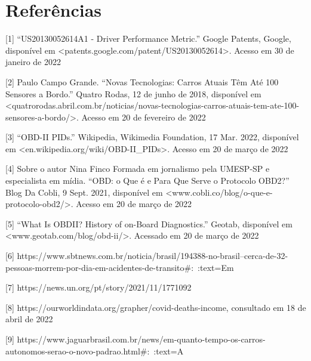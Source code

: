 \chapter{Referências}

[1] “US20130052614A1 - Driver Performance Metric.” Google Patents, Google, disponível em <patents.google.com/patent/US20130052614>. Acesso em 30 de janeiro de 2022

[2] Paulo Campo Grande. “Novas Tecnologias: Carros Atuais Têm Até 100 Sensores a Bordo.” Quatro Rodas, 12 de junho de 2018, disponível em <quatrorodas.abril.com.br/noticias/novas-tecnologias-carros-atuais-tem-ate-100-sensores-a-bordo/>. Acesso em 20 de fevereiro de 2022

[3] “OBD-II PIDs.” Wikipedia, Wikimedia Foundation, 17 Mar. 2022, disponível em <en.wikipedia.org/wiki/OBD-II_PIDs>. Acesso em 20 de março de 2022

[4] Sobre o autor Nina Finco Formada em jornalismo pela UMESP-SP e especialista em mídia. “OBD: o Que é e Para Que Serve o Protocolo OBD2?” Blog Da Cobli, 9 Sept. 2021, disponível em <www.cobli.co/blog/o-que-e-protocolo-obd2/>. Acesso em 20 de março de 2022

[5] “What Is OBDII? History of on-Board Diagnostics.” Geotab, disponível em <www.geotab.com/blog/obd-ii/>. Acessado em 20 de março de 2022

[6] https://www.sbtnews.com.br/noticia/brasil/194388-no-brasil--cerca-de-32-pessoas-morrem-por-dia-em-acidentes-de-transito#:~:text=Em%

[7] https://news.un.org/pt/story/2021/11/1771092

[8] https://ourworldindata.org/grapher/covid-deaths-income, consultado em 18 de abril de 2022

[9] https://www.jaguarbrasil.com.br/news/em-quanto-tempo-os-carros-autonomos-serao-o-novo-padrao.html#:~:text=A%


